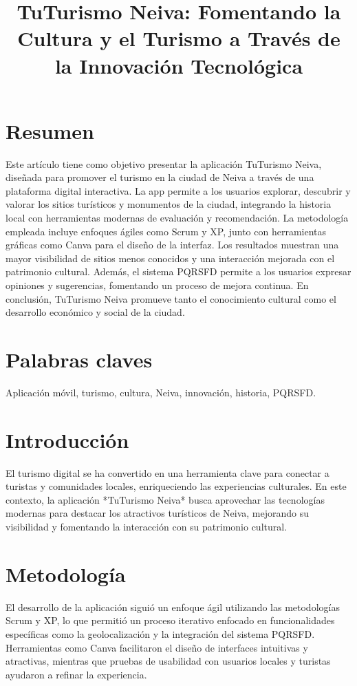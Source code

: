 \documentclass[conference]{IEEEtran}
\title{TuTurismo Neiva: Fomentando la Cultura y el Turismo a Través de la Innovación Tecnológica}
\author{
    \IEEEauthorblockN{Valentina Silva Garrido,\\ Mariana González Calderón, \\Maydy Viviana Conde Ladino,\\
    Dylan Santiago Narváez Pinto,\\ Isabela Gutiérrez Córdoba, \\Iván Andrés Murcia Epia}
    \IEEEauthorblockA{
        Neiva, Huila}
}
\begin{document}
\maketitle

\section{Resumen}
Este artículo tiene como objetivo presentar la aplicación TuTurismo Neiva, diseñada para promover el turismo en la ciudad de Neiva a través de una plataforma digital interactiva. La app permite a los usuarios explorar, descubrir y valorar los sitios turísticos y monumentos de la ciudad, integrando la historia local con herramientas modernas de evaluación y recomendación. La metodología empleada incluye enfoques ágiles como Scrum y XP, junto con herramientas gráficas como Canva para el diseño de la interfaz. Los resultados muestran una mayor visibilidad de sitios menos conocidos y una interacción mejorada con el patrimonio cultural. Además, el sistema PQRSFD permite a los usuarios expresar opiniones y sugerencias, fomentando un proceso de mejora continua. En conclusión, TuTurismo Neiva promueve tanto el conocimiento cultural como el desarrollo económico y social de la ciudad.


\section{Palabras claves}
Aplicación móvil, turismo, cultura, Neiva, innovación, historia, PQRSFD.

\section{Introducción}
El turismo digital se ha convertido en una herramienta clave para conectar a turistas y comunidades locales, enriqueciendo las experiencias culturales. En este contexto, la aplicación *TuTurismo Neiva* busca aprovechar las tecnologías modernas para destacar los atractivos turísticos de Neiva, mejorando su visibilidad y fomentando la interacción con su patrimonio cultural.

\section{Metodología}
El desarrollo de la aplicación siguió un enfoque ágil utilizando las metodologías Scrum y XP, lo que permitió un proceso iterativo enfocado en funcionalidades específicas como la geolocalización y la integración del sistema PQRSFD. Herramientas como Canva facilitaron el diseño de interfaces intuitivas y atractivas, mientras que pruebas de usabilidad con usuarios locales y turistas ayudaron a refinar la experiencia.
\end{document}

